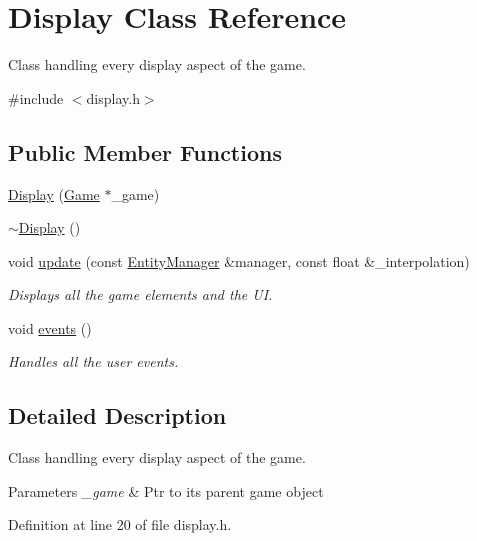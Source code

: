\hypertarget{class_display}{\section{Display Class Reference}
\label{class_display}
}


Class handling every display aspect of the game.  




{\ttfamily \#include $<$display.\-h$>$}

\subsection*{Public Member Functions}
\begin{DoxyCompactItemize}
\item 
\hyperlink{class_display_a21052a50c5e922272d697aaf5cfb14cc}{Display} (\hyperlink{class_game}{Game} $\ast$\-\_\-game)
\item 
\hyperlink{class_display_ac2607a6bb236c55547a4223d40d85d1f}{$\sim$\-Display} ()
\item 
void \hyperlink{class_display_a713ee81045f32895c2b063037c81c388}{update} (const \hyperlink{class_entity_manager}{Entity\-Manager} \&manager, const float \&\-\_\-interpolation)
\begin{DoxyCompactList}\small\item\em Displays all the game elements and the U\-I. \end{DoxyCompactList}\item 
void \hyperlink{class_display_a05ee6cd33afcc51a5856148677a71c82}{events} ()
\begin{DoxyCompactList}\small\item\em Handles all the user events. \end{DoxyCompactList}\end{DoxyCompactItemize}


\subsection{Detailed Description}
Class handling every display aspect of the game. 


\begin{DoxyParams}{Parameters}
{\em \-\_\-game} & Ptr to its parent game object \\
\hline
\end{DoxyParams}


Definition at line 20 of file display.\-h.



